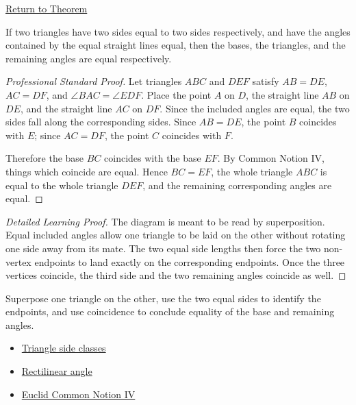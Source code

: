 \newpage
{}
\label{prf:euclid-i-4}

\begin{remark*}[Return]
\hyperref[thm:euclid-i-4]{Return to Theorem}
\end{remark*}

\begin{theorem*}
If two triangles have two sides equal to two sides respectively, and have the
angles contained by the equal straight lines equal, then the bases, the
triangles, and the remaining angles are equal respectively.
\end{theorem*}



\begin{proof}[Professional Standard Proof]
\LRAProofBodyStart
Let triangles $ABC$ and $DEF$ satisfy $AB=DE$, $AC=DF$, and
$\angle BAC=\angle EDF$. Place the point $A$ on $D$, the straight line $AB$ on
$DE$, and the straight line $AC$ on $DF$. Since the included angles are equal,
the two sides fall along the corresponding sides. Since $AB=DE$, the point $B$
coincides with $E$; since $AC=DF$, the point $C$ coincides with $F$.

Therefore the base $BC$ coincides with the base $EF$. By Common Notion IV,
things which coincide are equal. Hence $BC=EF$, the whole triangle $ABC$ is
equal to the whole triangle $DEF$, and the remaining corresponding angles are
equal.
\end{proof}

\begin{proof}[Detailed Learning Proof]
\LRAProofBodyStart
The diagram is meant to be read by superposition. Equal included angles allow
one triangle to be laid on the other without rotating one side away from its
mate. The two equal side lengths then force the two non-vertex endpoints to
land exactly on the corresponding endpoints. Once the three vertices coincide,
the third side and the two remaining angles coincide as well.
\end{proof}

\begin{remark*}
Superpose one triangle on the other, use the two equal sides to identify the
endpoints, and use coincidence to conclude equality of the base and remaining
angles.
\end{remark*}

\begin{dependencies}
\begin{itemize}
  \item \hyperref[def:euclid-triangle-side-classes]{Triangle side classes}
  \item \hyperref[def:euclid-rectilinear-angle]{Rectilinear angle}
  \item \hyperref[ax:euclid-common-notion-coinciding-things-equal]{Euclid Common Notion IV}
\end{itemize}
\end{dependencies}

\clearpage
